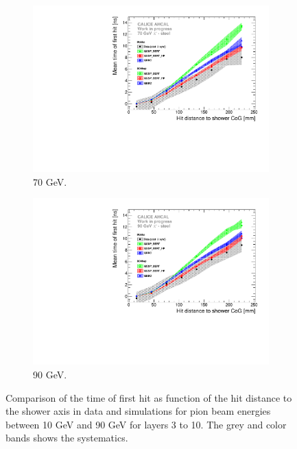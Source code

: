 \begin{figure}[htbp!]
\begin{subfigure}[t]{0.5\textwidth}
    \includegraphics[width=1\textwidth]{../Thesis_Plots/Timing/Pions/Plots/ComparisonToSim/Time_Radius_70GeV_SSF.pdf}
    \caption{70 GeV.} \label{fig:Radius_SSF_SimData_70GeV}
  \end{subfigure}
  \hfill
  \begin{subfigure}[t]{0.5\textwidth}
    \centering
    \includegraphics[width=1\textwidth]{../Thesis_Plots/Timing/Pions/Plots/ComparisonToSim/Time_Radius_90GeV_SSF.pdf}
    \caption{90 GeV.} \label{fig:Radius_SSF_SimData_90GeV}
  \end{subfigure}
  \caption{Comparison of the time of first hit as function of the hit distance to the shower axis in data and simulations for pion beam energies between 10 GeV and 90 GeV for layers 3 to 10. The grey and color bands shows the systematics.}
\end{figure}

